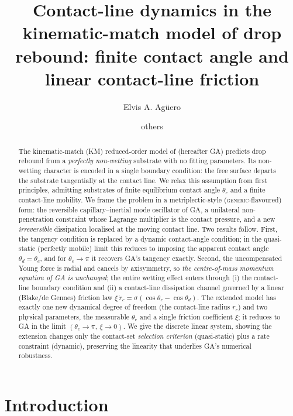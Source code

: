 \documentclass{jfm}
\title{Contact-line dynamics in the kinematic-match model of drop rebound:
finite contact angle and linear contact-line friction}
\author{Elvis A. Ag\"uero\aff{1} \and others}
\affiliation{\aff{1}School of Engineering, Brown University, Providence, RI 02912, USA}
\begin{document}
\maketitle

\begin{abstract}
The kinematic-match (KM) reduced-order model of \citet{gabbard2025} (hereafter GA)
predicts drop rebound from a \emph{perfectly non-wetting} substrate with no fitting
parameters. Its non-wetting character is encoded in a single boundary condition: the
free surface departs the substrate tangentially at the contact line. We relax this
assumption from first principles, admitting substrates of finite equilibrium contact
angle $\theta_e$ and a finite contact-line mobility. We frame the problem in a
metriplectic-style (\textsc{generic}-flavoured) form: the reversible capillary--inertial mode oscillator
of GA, a unilateral non-penetration constraint whose Lagrange multiplier is the contact
pressure, and a new \emph{irreversible} dissipation localised at the moving contact
line. Two results follow. First, the tangency condition is replaced by a dynamic
contact-angle condition; in the quasi-static (perfectly mobile) limit this reduces to
imposing the apparent contact angle $\theta_d=\theta_e$, and for $\theta_e\to\pi$ it
recovers GA's tangency exactly. Second, the uncompensated Young force is radial and
cancels by axisymmetry, so \emph{the centre-of-mass momentum equation of GA is
unchanged}; the entire wetting effect enters through (i) the contact-line boundary
condition and (ii) a contact-line dissipation channel governed by a linear (Blake/de
Gennes) friction law $\xi\,\dot r_c=\sigma(\cos\theta_e-\cos\theta_d)$. The extended
model has exactly one new dynamical degree of freedom (the contact-line radius $r_c$)
and two physical parameters, the measurable $\theta_e$ and a single friction
coefficient $\xi$; it reduces to GA in the limit $(\theta_e\to\pi,\ \xi\to0)$. We give
the discrete linear system, showing the extension changes only the contact-set
\emph{selection criterion} (quasi-static) plus a rate constraint (dynamic), preserving
the linearity that underlies GA's numerical robustness.
\end{abstract}

\section{Introduction}\label{sec:intro}
\end{document}
